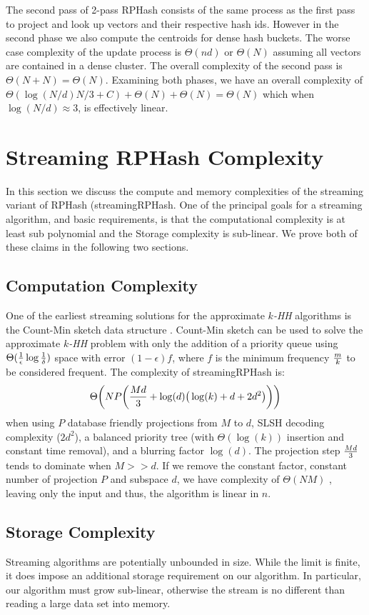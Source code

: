 The second pass of 2-pass \textsf{RPHash} consists of the same process as the first pass to project and look
up vectors and their respective hash ids.  However in the second phase we also compute the centroids
for dense hash buckets.  The worse case complexity of the update process is $\Theta(nd)$ or
$\Theta(N)$ assuming all vectors are contained in a dense cluster.  The overall complexity of the
second pass is $\Theta(N+N) = \Theta(N)$.  Examining both phases, we have an overall complexity of
$\Theta(\log(N/d)N/3 + C ) + \Theta(N) + \Theta(N) = \Theta(N)$ which when $\log(N/d)\approx 3$, is
effectively linear.

\section{Streaming RPHash Complexity}
In this section we discuss the compute and memory complexities of the streaming variant of \textsf{RPHash}
(\textsf{streamingRPHash}.  One of the principal goals for a streaming algorithm, and basic
requirements, is that the computational complexity is at least sub polynomial and the Storage
complexity is sub-linear. We prove both of these claims in the following two sections.

\subsection{Computation Complexity}
One of the earliest streaming solutions for the approximate \emph{$k$-HH} algorithms is the
Count-Min sketch data structure \cite{cormode2}.
Count-Min sketch can be used to solve the approximate \emph{$k$-HH} problem with only the addition
of a priority queue using $\Theta({1\over \epsilon} \log {1 \over \delta})$ space with error
$(1-\epsilon)f$, where $f$ is the minimum frequency $m \over k$ to be considered frequent.  The
complexity of \textsf{streamingRPHash} is:
$$\Theta \bigg( NP\bigg(  {{Md}\over{3}} +\log(d)\big(\log(k)+d+2d^2\big)\bigg ) \bigg)$$
when using $P$ database friendly projections from $M$ to $d$, SLSH decoding complexity ($2d^2$), a
balanced priority tree (with $\Theta(\log(k))$ insertion and constant time removal), and a blurring
factor $\log(d)$.  The projection step ${{Md}\over{3}}$ tends to dominate when $M>>d$.  If we remove
the constant factor, constant number of projection $P$ and subspace $d$, we have complexity of
$\Theta(NM)$ , leaving only the input and thus, the algorithm is linear in $n$.
 
\subsection{Storage Complexity}
Streaming algorithms are potentially unbounded in size. While the limit is finite, it does 
impose an additional storage requirement on our algorithm. In particular, our algorithm must
grow sub-linear, otherwise the stream is no different than reading a large data set into memory.

